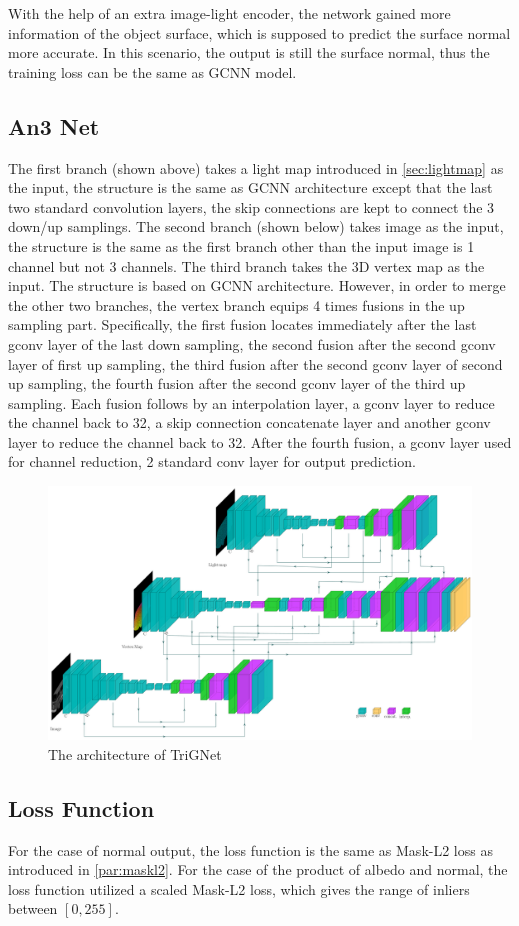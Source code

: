\documentclass[border=15pt, multi, tikz]{article}
\begin{document}
With the help of an extra image-light encoder, the network gained more information of the object surface, which is supposed to predict the surface normal more accurate. In this scenario, the output is still the surface normal, thus the training loss can be the same as GCNN model.



\subsection{An3 Net}
The first branch (shown above) takes a light map introduced in \ref{sec:lightmap} as the input, the structure is the same as GCNN architecture except that the last two standard convolution layers, the skip connections are kept to connect the 3 down/up samplings. 
The second branch (shown below) takes image as the input, the structure is the same as the first branch other than the input image is 1 channel but not 3 channels. 
The third branch takes the 3D vertex map as the input. The structure is based on GCNN architecture. However, in order to merge the other two branches, the vertex branch equips 4 times fusions in the up sampling part. Specifically, the first fusion locates immediately after the last gconv layer of the last down sampling, the second fusion after the second gconv layer of first up sampling, the third fusion after the second gconv layer of second up sampling, the fourth fusion after the second gconv layer of the third up sampling. Each fusion follows by an interpolation layer, a gconv layer to reduce the channel back to 32, a skip connection concatenate layer and another gconv layer to reduce the channel back to 32. After the fourth fusion, a gconv layer used for channel reduction, 2 standard conv layer for output prediction.

\begin{figure}
	\centering
	\includegraphics[width=1\textwidth]{Figures/trignet} %
	\caption{The architecture of TriGNet}
	\label{fig:albedo-gated-archi}
\end{figure}


\subsection{Loss Function}
For the case of normal output, the loss function is the same as Mask-L2 loss as introduced in \ref{par:maskl2}. For the case of the product of albedo and normal, the loss function utilized a scaled Mask-L2 loss, which gives the range of inliers between $ [0,255] $. 
\end{document}
